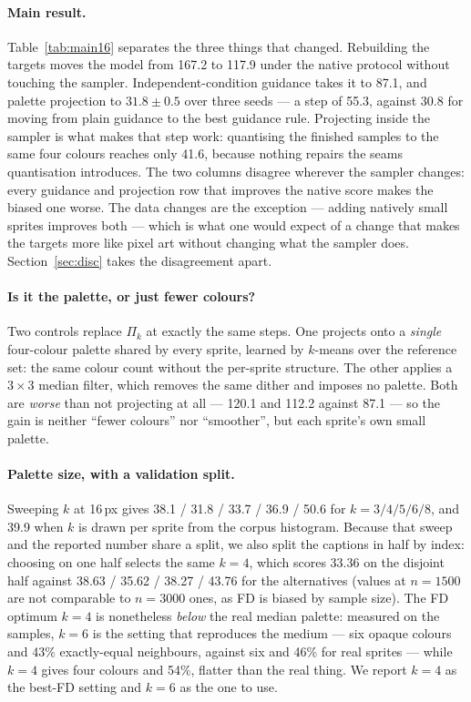 \documentclass[10pt,twocolumn,letterpaper]{article}
\begin{document}
\paragraph{Main result.}
Table~\ref{tab:main16} separates the three things that changed. Rebuilding the targets moves the model from 167.2 to
117.9 under the native protocol without touching the sampler. Independent-condition guidance takes it to 87.1, and
palette projection to $31.8 \pm 0.5$ over three seeds --- a step of 55.3, against 30.8 for moving from plain
guidance to the best guidance rule. Projecting inside the sampler is what makes that step work: quantising the finished samples to the same four
colours reaches only 41.6, because nothing repairs the seams quantisation introduces. The two columns disagree wherever the sampler changes: every guidance and
projection row that improves the native score makes the biased one worse. The data changes are the exception ---
adding natively small sprites improves both --- which is what one would expect of a change that makes the targets
more like pixel art without changing what the sampler does. Section~\ref{sec:disc} takes the disagreement apart.

\paragraph{Is it the palette, or just fewer colours?}
Two controls replace $\Pi_k$ at exactly the same steps. One projects onto a \emph{single} four-colour palette shared by
every sprite, learned by $k$-means over the reference set: the same colour count without the per-sprite structure. The
other applies a $3\times3$ median filter, which removes the same dither and imposes no palette. Both are \emph{worse}
than not projecting at all --- 120.1 and 112.2 against 87.1 --- so the gain is neither ``fewer colours'' nor
``smoother'', but each sprite's own small palette.

\paragraph{Palette size, with a validation split.}
Sweeping $k$ at 16\,px gives 38.1 / 31.8 / 33.7 / 36.9 / 50.6 for $k = 3/4/5/6/8$, and 39.9 when $k$ is drawn per
sprite from the corpus histogram. Because that sweep and the reported number share a split, we also split the captions
in half by index: choosing on one half selects the same $k{=}4$, which scores 33.36 on the disjoint half against
38.63 / 35.62 / 38.27 / 43.76 for the alternatives (values at $n{=}1500$ are not comparable to $n{=}3000$ ones, as FD
is biased by sample size). The FD optimum $k{=}4$ is nonetheless \emph{below} the real median palette: measured on the
samples, $k{=}6$ is the setting that reproduces the medium --- six opaque colours and 43\% exactly-equal neighbours,
against six and 46\% for real sprites --- while $k{=}4$ gives four colours and 54\%, flatter than the real thing. We
report $k{=}4$ as the best-FD setting and $k{=}6$ as the one to use.
\end{document}

